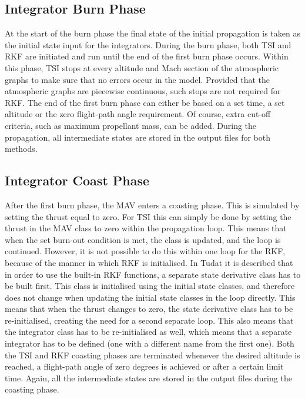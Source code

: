 \subsection{Integrator Burn Phase}
\label{subsec:integratorBurnPhase}
At the start of the burn phase the final state of the initial propagation is taken as the initial state input for the integrators. During the burn phase, both \ac{TSI} and \ac{RKF} are initiated and run until the end of the first burn phase occurs. Within this phase, \ac{TSI} stops at every altitude and Mach section of the atmospheric graphs to make sure that no errors occur in the model. Provided that the atmospheric graphs are piecewise continuous, such stops are not required for \ac{RKF}. The end of the first burn phase can either be based on a set time, a set altitude or the zero flight-path angle requirement. Of course, extra cut-off criteria, such as maximum propellant mass,  can be added. During the propagation, all intermediate states are stored in the output files for both methods.


\subsection{Integrator Coast Phase}
\label{subsec:integratorCoastPhase}
After the first burn phase, the \ac{MAV} enters a coasting phase. This is simulated by setting the thrust equal to zero. For \ac{TSI} this can simply be done by setting the thrust in the \ac{MAV} class to zero within the propagation loop. This means that when the set burn-out condition is met, the class is updated, and the loop is continued. However, it is not possible to do this within one loop for the \ac{RKF}, because of the manner in which \ac{RKF} is initialised. In \ac{Tudat} it is described that in order to use the built-in \ac{RKF} functions, a separate state derivative class has to be built first. This class is initialised using the initial state classes, and therefore does not change when updating the initial state classes in the loop directly. This means that when the thrust changes to zero, the state derivative class has to be re-initialised, creating the need for a second separate loop. This also means that the integrator class has to be re-initialised as well, which means that a separate integrator has to be defined (one with a different name from the first one). Both the \ac{TSI} and \ac{RKF} coasting phases are terminated whenever the desired altitude is reached, a flight-path angle of zero degrees is achieved or after a certain limit time. Again, all the intermediate states are stored in the output files during the coasting phase.


